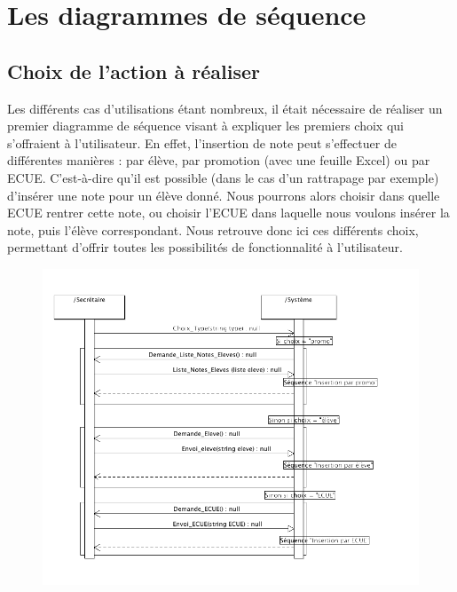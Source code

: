 \documentclass[letter, 11pt] {article}
\begin{document}
		\newpage
	
	\section{Les diagrammes de séquence}
	
		\subsection{Choix de l'action à réaliser}
		
		Les différents cas d’utilisations étant nombreux, il était nécessaire de réaliser un premier diagramme de séquence visant à expliquer les premiers choix qui s’offraient à l’utilisateur. En effet, l’insertion de note peut s’effectuer de différentes manières : par élève, par promotion (avec une feuille Excel) ou par ECUE. C'est-à-dire qu'il est possible (dans le cas d’un rattrapage par exemple) d'insérer une note pour un élève donné. Nous pourrons alors choisir dans quelle ECUE rentrer cette note, ou choisir l’ECUE dans laquelle nous voulons insérer la note, puis l’élève correspondant.
		Nous retrouve donc ici ces différents choix, permettant d’offrir toutes les possibilités de fonctionnalité à l’utilisateur.
		
		\begin{figure}[htbp]
			\centering
				\includegraphics[scale = 0.6]{../Diagrammes_sequence/Diagramme_sequence_choix_action}
		\end{figure}
		
\end{document}
